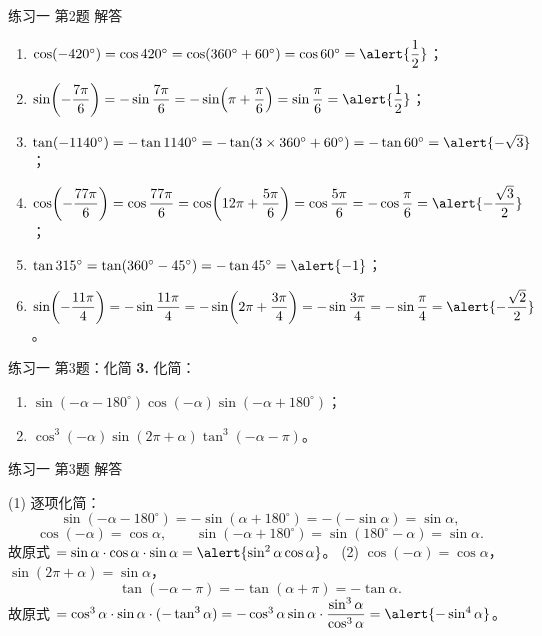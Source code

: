\documentclass[10pt,aspectratio=169,serif]{beamer}
\begin{document}
\begin{frame}[t]{练习一 第2题 解答}
\begin{tcolorbox}[colback=orange!10,colframe=orange,title=\textbf{解}]
\begin{enumerate}[(1)]
  \item $\cos(-420^\circ)=\cos420^\circ=\cos(360^\circ+60^\circ)=\cos60^\circ=\alert{\dfrac12}$；
  \item $\sin\!\left(-\dfrac{7\pi}{6}\right)=-\sin\dfrac{7\pi}{6}=-\sin\!\left(\pi+\dfrac{\pi}{6}\right)=\sin\dfrac{\pi}{6}=\alert{\dfrac12}$；
  \item $\tan(-1140^\circ)=-\tan1140^\circ=-\tan(3\times360^\circ+60^\circ)=-\tan60^\circ=\alert{-\sqrt3}$；
  \item $\cos\!\left(-\dfrac{77\pi}{6}\right)=\cos\dfrac{77\pi}{6}=\cos\!\left(12\pi+\dfrac{5\pi}{6}\right)=\cos\dfrac{5\pi}{6}=-\cos\dfrac{\pi}{6}=\alert{-\dfrac{\sqrt3}{2}}$；
  \item $\tan315^\circ=\tan(360^\circ-45^\circ)=-\tan45^\circ=\alert{-1}$；
  \item $\sin\!\left(-\dfrac{11\pi}{4}\right)=-\sin\dfrac{11\pi}{4}=-\sin\!\left(2\pi+\dfrac{3\pi}{4}\right)=-\sin\dfrac{3\pi}{4}=-\sin\dfrac{\pi}{4}=\alert{-\dfrac{\sqrt2}{2}}$。
\end{enumerate}
\end{tcolorbox}
\end{frame}

\begin{frame}[t]{练习一 第3题：化简}
\textbf{3.} 化简：
\begin{enumerate}[(1)]
  \item $\sin(-\alpha-180^\circ)\cos(-\alpha)\sin(-\alpha+180^\circ)$；
  \item $\cos^3(-\alpha)\sin(2\pi+\alpha)\tan^3(-\alpha-\pi)$。
\end{enumerate}
\end{frame}

\begin{frame}[t]{练习一 第3题 解答}
\begin{tcolorbox}[colback=orange!10,colframe=orange,title=\textbf{解}]
(1) 逐项化简：
\[
\sin(-\alpha-180^\circ)=-\sin(\alpha+180^\circ)=-(-\sin\alpha)=\sin\alpha,
\]
\[
\cos(-\alpha)=\cos\alpha,\qquad \sin(-\alpha+180^\circ)=\sin(180^\circ-\alpha)=\sin\alpha.
\]
故原式 $=\sin\alpha\cdot\cos\alpha\cdot\sin\alpha=\alert{\sin^2\alpha\cos\alpha}$。
\vspace{0.4em}
(2) $\cos(-\alpha)=\cos\alpha$，$\sin(2\pi+\alpha)=\sin\alpha$，
\[
\tan(-\alpha-\pi)=-\tan(\alpha+\pi)=-\tan\alpha.
\]
故原式 $=\cos^3\alpha\cdot\sin\alpha\cdot(-\tan^3\alpha)
=-\cos^3\alpha\sin\alpha\cdot\dfrac{\sin^3\alpha}{\cos^3\alpha}
=\alert{-\sin^4\alpha}$。
\end{tcolorbox}
\end{frame}
\end{document}
